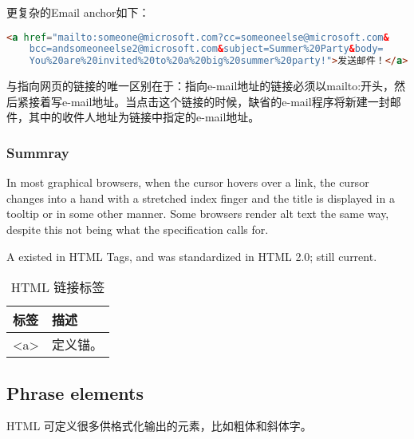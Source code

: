 更复杂的Email anchor如下：

\begin{lstlisting}[language=HTML]
	<a href="mailto:someone@microsoft.com?cc=someoneelse@microsoft.com&
	bcc=andsomeoneelse2@microsoft.com&subject=Summer%20Party&body=
	You%20are%20invited%20to%20a%20big%20summer%20party!">发送邮件！</a>
\end{lstlisting}

与指向网页的链接的唯一区别在于：指向e-mail地址的链接必须以mailto:开头，然后紧接着写e-mail地址。当点击这个链接的时候，缺省的e-mail程序将新建一封邮件，其中的收件人地址为链接中指定的e-mail地址。


\subsubsection{Summray}


In most graphical browsers, when the cursor hovers over a link, the cursor changes into a hand with a stretched index finger and the title is displayed in a tooltip or in some other manner. Some browsers render alt text the same way, despite this not being what the specification calls for.

A existed in HTML Tags, and was standardized in HTML 2.0; still current.

\begin{table}[!h]
\centering
\caption{HTML 链接标签}
\begin{tabular}{|l|l|}
\hline
标签		&描述		\\
\hline
<a>		&定义锚。	\\
\hline
\end{tabular}
\end{table}





\subsection{Phrase elements}

HTML 可定义很多供格式化输出的元素，比如粗体和斜体字。


